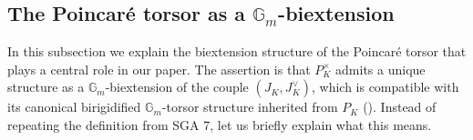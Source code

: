 \documentclass[11pt,oneside]{amsart}
\theoremstyle{plain}
\theoremstyle{definition}
\def\lra{{\longrightarrow}}
\def\G{{\bf G}}
\DeclareMathOperator{\Gm}{\mathbb{G}_m}
\DeclareMathOperator{\Pic}{Pic}
\def\G{\mathbb{G}}
\def\Gm{{\mathbb{G}_m}}
\begin{document}



\subsection{The Poincar\'e torsor as a $\Gm$-biextension}\label{S:PoincareTorsor}


In this subsection we explain the biextension structure of the Poincar\'e torsor that plays a central role in our paper. The assertion is that $P_K^\times$ admits a unique structure as a $\G_m$-biextension of the couple $(J_K, J_K^\vee)$, which is compatible with its canonical birigidified $\Gm$-torsor structure inherited from $P_K$  
(\cite[VII.Definition 2.1, Exemple 2.9.5]{SGA7}). Instead of repeating the definition from SGA 7, let us briefly explain what this means.  %

\end{document}
